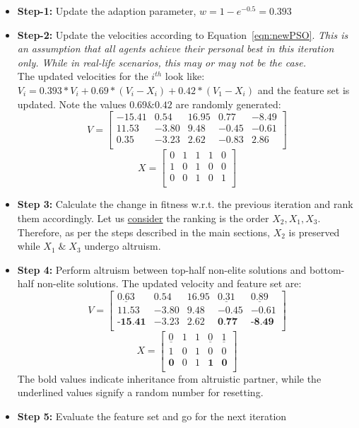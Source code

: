 \documentclass[final,3p,times]{elsarticle}
\begin{document}
\begin{itemize}
    \item \textbf{Step-1: }Update the adaption parameter, $w=1-e^{-0.5}=0.393$
    \item \textbf{Step-2: }Update the velocities according to Equation~\ref{eqn:newPSO}. \emph{This is an assumption that all agents achieve their personal best in this iteration only. While in real-life scenarios, this may or may not be the case.}\\
    The updated velocities for the $i^{th}$ look like: $V_i=0.393*V_i+0.69*(V_i-X_i)+0.42*(V_1-X_i)$ and the feature set is updated. Note the values $0.69 \& 0.42$ are randomly generated:
    \[
V=
  \begin{bmatrix}
    -15.41 & 0.54 & 16.95 & 0.77 & -8.49 \\
    11.53 & -3.80 & 9.48 & -0.45 & -0.61 \\
    0.35 & -3.23 & 2.62 & -0.83 & 2.86\\
  \end{bmatrix}
  \]
\[
X= \begin{bmatrix}
  0 & 1 & 1 & 1 & 0\\
  1 & 0 & 1 & 0 & 0\\
  0 & 0 & 1 & 0 & 1\\
\end{bmatrix}
\]  
    \item \textbf{Step 3: }Calculate the change in fitness w.r.t. the previous iteration and rank them accordingly. Let us \underline{consider} the ranking is the order $X_2,X_1,X_3$. Therefore, as per the steps described in the main sections, $X_2$ is preserved while $X_1\;\&\;X_3$ undergo altruism.
    \item \textbf{Step 4:} Perform altruism between top-half non-elite solutions and bottom-half non-elite solutions. The updated velocity and feature set are:
    \[
V=
  \begin{bmatrix}
    \underline{0.63} & 0.54 & 16.95 & \underline{0.31} & \underline{0.89} \\
    11.53 & -3.80 & 9.48 & -0.45 & -0.61 \\
    \textbf{-15.41} & -3.23 & 2.62 & \textbf{0.77} & \textbf{-8.49}\\
  \end{bmatrix}\]
\[
X= \begin{bmatrix}
  \underline{0} & 1 & 1 & \underline{0} & \underline{1}\\
  1 & 0 & 1 & 0 & 0\\
  \textbf{0} & 0 & 1 & \textbf{1} & \textbf{0}\\
\end{bmatrix}
\]
The bold values indicate inheritance from altruistic partner, while the underlined values signify a random number for resetting.
\item \textbf{Step 5: }Evaluate the feature set and go for the next iteration
\end{itemize}
\end{document}

